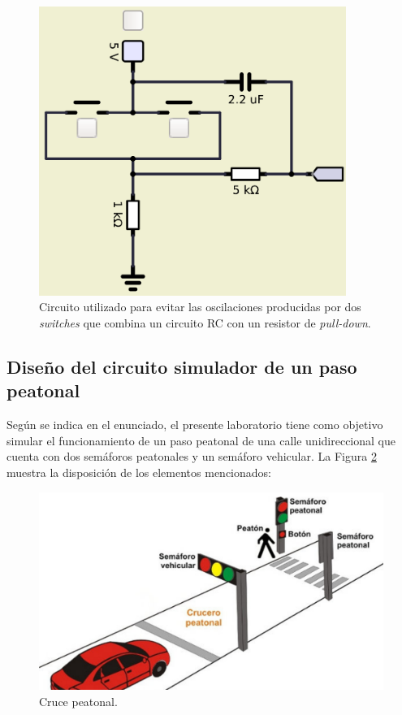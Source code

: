 \begin{figure}[H]
\centering
\includegraphics[width=100mm]{./Figuras/Nota_teorica/RC3}
\caption{Circuito utilizado para evitar las oscilaciones producidas por dos \textit{switches} que combina un circuito RC con un resistor de \textit{pull-down}.}
\label{fig:RC3}
\end{figure}

\subsection{Diseño del circuito simulador de un paso peatonal} \label{sec:cir2}
Según se indica en el enunciado, el presente laboratorio tiene como objetivo simular el funcionamiento de un paso peatonal de una calle unidireccional que cuenta con dos semáforos peatonales y un semáforo vehicular. La Figura \ref{fig:enun} muestra la disposición de los elementos mencionados: 

\begin{figure}[H]
\centering
\includegraphics[width=120mm]{./Figuras/Nota_teorica/enun}
\caption{Cruce peatonal.}
\label{fig:enun}
\end{figure}

